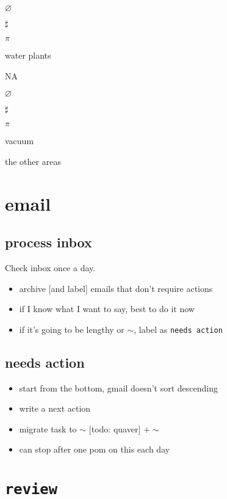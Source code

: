 \documentclass[]{book}
\providecommand{\tightlist}{%
  \setlength{\itemsep}{0pt}\setlength{\parskip}{0pt}}
\begin{document}
\(\varnothing\)

\(\sharp\)

\(\pi\)

water plants

NA

\(\varnothing\)

\(\sharp\)

\(\pi\)

vacuum

the other areas

\hypertarget{email}{%
\section{email}\label{email}}

\hypertarget{process-inbox}{%
\subsection{process inbox}\label{process-inbox}}

Check inbox once a day.

\begin{itemize}
\tightlist
\item
  archive {[}and label{]} emails that don't require actions
\item
  if I know what I want to say, best to do it now
\item
  if it's going to be lengthy or \(\sim\), label as \texttt{needs\ action}
\end{itemize}

\hypertarget{needs-action}{%
\subsection{needs action}\label{needs-action}}

\begin{itemize}
\tightlist
\item
  start from the bottom, gmail doesn't sort descending
\item
  write a next action
\item
  migrate task to \(\sim\) {[}todo: quaver{]} \(+ \sim\)
\item
  can stop after one pom on this each day
\end{itemize}

\hypertarget{review}{%
\section{\texorpdfstring{\textbf{\texttt{review}}}{review}}\label{review}}
\end{document}
